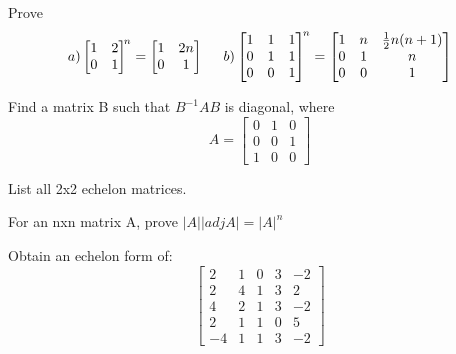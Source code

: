 \documentclass[11pt]{amsbook}
\begin{document}
\begin{exercise}
Prove   \[ a)
  \begin{bmatrix}
    1 & 2 \\
    0 & 1  \\ 
  \end{bmatrix}^{\!n}
 = 
  \begin{bmatrix}
    1 & 2n \\
    0 & 1  \\ 
  \end{bmatrix} \hspace{5mm}
b)      \begin{bmatrix}
1 & 1 & 1 \\
0 & 1 & 1 \\
0 & 0 & 1
\end{bmatrix}^{\!n} = \begin{bmatrix}
1 & n & \frac{1}{2} n(n+1) \\
0 & 1 & n \\
0 & 0 & 1
\end{bmatrix}
\]
\end{exercise}


\begin{exercise}
Find a matrix B such that $B^{-1}AB$ is diagonal, where
\[A= \begin{bmatrix}
0 & 1 & 0 \\
0 & 0 & 1 \\
1 & 0 & 0
\end{bmatrix} \]
\end{exercise}


\begin{exercise}
List all 2x2 echelon matrices.
\end{exercise}


\begin{exercise}
For an nxn matrix A, prove $ \mathopen|A\mathclose| \mathopen|adj A\mathclose| = \mathopen|A\mathclose|^{n}$
\end{exercise}


\begin{exercise}
Obtain an echelon form of: 
\[\begin{bmatrix}
2 & 1 & 0 & 3 & -2 \\
2 & 4 & 1 & 3 & 2 \\
4 & 2 & 1 & 3 & -2 \\
2 & 1 & 1 & 0 & 5 \\
-4 & 1 & 1 & 3 & -2 
\end{bmatrix}\]
\end{exercise}
\end{document}
